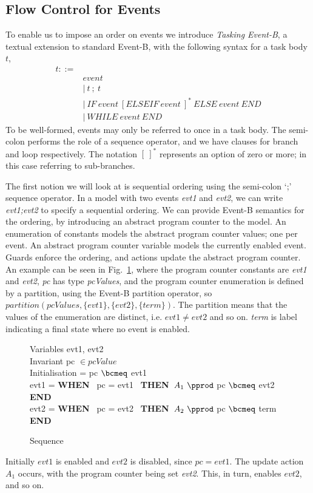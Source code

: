  
\subsection{Flow Control for Events}\label{flow}
To enable us to impose an order on events we introduce \emph{Tasking Event-B}, a textual extension to standard Event-B, with the following syntax for a task body $t$,
%
\begin{equation}\label{eq:syntax}
\begin{split}
t ::=&\\
& event\\
&\vert ~ t~;~t\\
&\vert ~ IF~ event~ [ELSEIF~ event~]^*~ ELSE~ event~ END\\
&\vert ~ WHILE~ event~ END
\end{split}
\end{equation}
%
To be well-formed, events may only be referred to once in a task body. The semi-colon performs the role of a sequence operator, and we have clauses for branch and loop respectively. The notation $[~]^*$ represents an option of zero or more; in this case referring to sub-branches.

The first notion we will look at is sequential ordering using the semi-colon `;' sequence operator. In a model with two events \emph{evt1} and \emph{evt2}, we can write \emph{evt1;evt2} to specify a sequential ordering. We can provide Event-B semantics for the ordering, by introducing an abstract program counter to the model. An enumeration of constants models the abstract program counter values; one per event. An abstract program counter variable models the currently enabled event. Guards enforce the ordering, and actions update the abstract program counter. An example can be seen in Fig.~\ref{fig:seq}, where the program counter constants are \emph{evt1} and \emph{evt2}, \emph{pc} has type \emph{pcValues}, and the program counter enumeration is defined by a partition, using the Event-B partition operator, so $partition(pcValues, \{evt1\}, \{evt2\},\{term\})$. The partition means that the values of the enumeration are distinct, i.e. $evt1 \neq evt2$ and so on. \emph{term} is label indicating a final state where no event is enabled.
%
\begin{figure}[b]
\centering
\begin{minipage}{0.7\textwidth}
Variables evt1, evt2\\
Invariant pc $\in pcValue$ \\
Initialisation = pc $\bcmeq$ evt1 \\
evt1 = \textbf{WHEN}~ pc = evt1~ \textbf{THEN}~$A_1~ \pprod$ pc $\bcmeq$ evt2 \textbf{END}\\
evt2 = \textbf{WHEN}~ pc = evt2~ \textbf{THEN}~$A_2~ \pprod$ pc $\bcmeq$ term \textbf{END}\\
\end{minipage}
\caption{Sequence}
\label{fig:seq}
\end{figure}
Initially $evt1$ is enabled and $evt2$ is disabled, since $pc = evt1$. The update action $A_1$ occurs, with the program counter being set \emph{evt2}. This, in turn, enables $evt2$, and so on.
